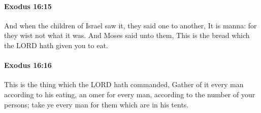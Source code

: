 		\paragraph{Exodus 16:15} %
			\label{EXODUS-16-15}

			And when the children of Israel saw it, they said one to another, It is manna: for they wist not what it was. And Moses said unto them, This is the bread which the LORD hath given you to eat.


		\paragraph{Exodus 16:16} %
			\label{EXODUS-16-16}

			This is the thing which the LORD hath commanded, Gather of it every man according to his eating, an omer for every man, according to the number of your persons; take ye every man for them which are in his tents.

